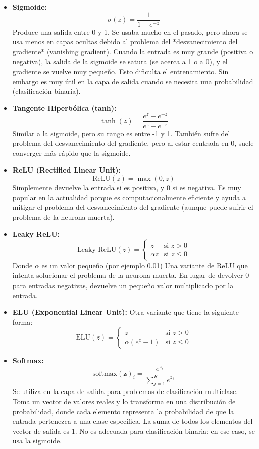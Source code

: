 \documentclass{article}
\begin{document}
\begin{itemize}
    \item \textbf{Sigmoide:}
        \[
        \sigma(z) = \frac{1}{1 + e^{-z}}
        \]
        Produce una salida entre 0 y 1.  Se usaba mucho en el pasado, pero ahora se usa menos en capas ocultas debido al problema del *desvanecimiento del gradiente* (vanishing gradient).  Cuando la entrada es muy grande (positiva o negativa), la salida de la sigmoide se satura (se acerca a 1 o a 0), y el gradiente se vuelve muy pequeño.  Esto dificulta el entrenamiento. Sin embargo es muy útil en la capa de salida cuando se necesita una probabilidad (clasificación binaria).

    \item \textbf{Tangente Hiperbólica (tanh):}
        \[
        \tanh(z) = \frac{e^{z} - e^{-z}}{e^{z} + e^{-z}}
        \]
        Similar a la sigmoide, pero su rango es entre -1 y 1.  También sufre del problema del desvanecimiento del gradiente, pero al estar centrada en 0, suele converger más rápido que la sigmoide.

    \item \textbf{ReLU (Rectified Linear Unit):}
        \[
        \text{ReLU}(z) = \max(0, z)
        \]
        Simplemente devuelve la entrada si es positiva, y 0 si es negativa.  Es muy popular en la actualidad porque es computacionalmente eficiente y ayuda a mitigar el problema del desvanecimiento del gradiente (aunque puede sufrir el problema de la neurona muerta).

    \item \textbf{Leaky ReLU:}
       \[
        \text{Leaky ReLU}(z) = \begin{cases}
        z & \text{si } z > 0 \\
        \alpha z & \text{si } z \leq 0
        \end{cases}
        \]
    Donde \(\alpha\) es un valor pequeño (por ejemplo 0.01)
        Una variante de ReLU que intenta solucionar el problema de la neurona muerta.  En lugar de devolver 0 para entradas negativas, devuelve un pequeño valor multiplicado por la entrada.

    \item \textbf{ELU (Exponential Linear Unit):} Otra variante que tiene la siguiente forma:
       \[
        \text{ELU}(z) = \begin{cases}
        z & \text{si } z > 0 \\
        \alpha (e^z -1) & \text{si } z \leq 0
        \end{cases}
        \]

    \item \textbf{Softmax:}
        \[
        \text{softmax}{(\mathbf{z})}_i = \frac{e^{z_i}}{\sum_{j=1}^{K} e^{z_j}}
        \]
        Se utiliza en la capa de salida para problemas de clasificación multiclase.  Toma un vector de valores reales y lo transforma en una distribución de probabilidad, donde cada elemento representa la probabilidad de que la entrada pertenezca a una clase específica.  La suma de todos los elementos del vector de salida es 1.  No es adecuada para clasificación binaria; en ese caso, se usa la sigmoide.
\end{itemize}
\end{document}
